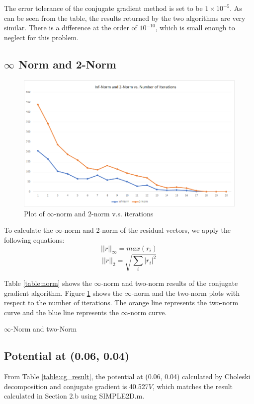 \documentclass[a4paper,titlepage]{article}
\begin{document}
				The error tolerance of the conjugate gradient method is set to be $1\times 10^{-5}$. As can be seen from the table, the results returned by the two algorithms are very similar. There is a difference at the order of $10^{-10}$, which is small enough to neglect for this problem.
			\subsection{$\infty$ Norm and 2-Norm}
				\begin{figure}[H]
					\centering
					\includegraphics[width=0.7\linewidth]{two_norm_plot}
					\caption{Plot of $\infty$-norm and $2$-norm v.s. iterations}
					\label{two_norm_plot}
				\end{figure}	
				To calculate the $\infty$-norm and 2-norm of the residual vectors, we apply the following equations:
				\begin{equation}
					||r||_{\infty} = max(r_i)
				\end{equation}
				\begin{equation}
					||r||_2 = \sqrt{\sum_{i} |r_i|^2}
				\end{equation}
				
				Table \ref{table:norm} shows the $\infty$-norm and two-norm results of the conjugate gradient algorithm. Figure \ref{two_norm_plot} shows the $\infty$-norm and the two-norm plots with respect to the number of iterations. The orange line represents the two-norm curve and the blue line represents the $\infty$-norm curve. 
				\begin{table}[!htb]
					\centering
					\caption{$\infty$-Norm and two-Norm}
					\label{table:norm}
				\end{table}
			\subsection{Potential at (0.06, 0.04)}
				From Table \ref{table:cg_result}, the potential at (0.06, 0.04) calculated by Choleski decomposition and conjugate gradient is 40.527$V$, which matches the result calculated in Section 2.b using SIMPLE2D.m.
				
\end{document}
